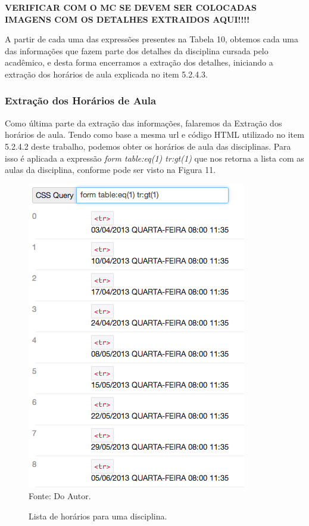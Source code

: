 \textbf{VERIFICAR COM O MC SE DEVEM SER COLOCADAS IMAGENS COM OS DETALHES EXTRAIDOS AQUI!!!!}

A partir de cada uma das expressões presentes na Tabela 10, obtemos cada uma das informações que fazem parte dos detalhes da disciplina cursada pelo acadêmico, e desta forma encerramos a extração dos detalhes, iniciando a extração dos horários de aula explicada no item 5.2.4.3.

\subsubsection{Extração dos Horários de Aula}
Como última parte da extração das informações, falaremos da Extração dos horários de aula. Tendo como base a mesma url e código HTML utilizado no item 5.2.4.2 deste trabalho, podemos obter os horários de aula das disciplinas. Para isso é aplicada a expressão \emph{form table:eq(1) tr:gt(1)} que nos retorna a lista com as aulas da disciplina, conforme pode ser visto na Figura 11.

\begin{figure}[!htb]
     \centering
     \caption[Extração de Informações - Horários do Semestre]{Lista de horários para uma disciplina.}
     \includegraphics[scale=0.5]{imagens/listahorariossemestre.png}
     \\  Fonte: Do Autor.
\end{figure}

